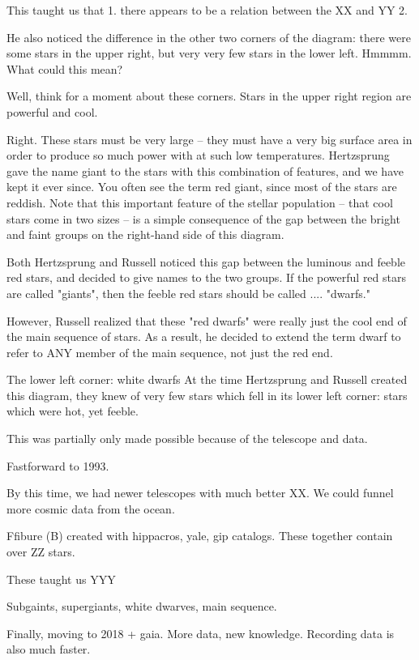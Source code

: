  This taught us that
 1. there appears to be a relation between the XX and YY
 2.


 He also noticed the difference in the other two corners of the diagram: there were some stars in the upper right, but very very few stars in the lower left. Hmmmm. What could this mean?

Well, think for a moment about these corners. Stars in the upper right region are powerful and cool.

Right. These stars must be very large -- they must have a very big surface area in order to produce so much power with at such low temperatures. Hertzsprung gave the name giant to the stars with this combination of features, and we have kept it ever since. You often see the term red giant, since most of the stars are reddish. Note that this important feature of the stellar population -- that cool stars come in two sizes -- is a simple consequence of the gap between the bright and faint groups on the right-hand side of this diagram.

Both Hertzsprung and Russell noticed this gap between the luminous and feeble red stars, and decided to give names to the two groups. If the powerful red stars are called "giants", then the feeble red stars should be called .... "dwarfs."


However, Russell realized that these "red dwarfs" were really just the cool end of the main sequence of stars. As a result, he decided to extend the term dwarf to refer to ANY member of the main sequence, not just the red end.


The lower left corner: white dwarfs
At the time Hertzsprung and Russell created this diagram, they knew of very few stars which fell in its lower left corner: stars which were hot, yet feeble.

This was partially only made possible because of the telescope and data.




Fastforward to 1993.

By this time, we had newer telescopes with much better XX.
We could funnel more cosmic data from the ocean.

Ffibure (B) created with hippacros, yale, gip catalogs. These together
contain over ZZ stars.

These taught us YYY


Subgaints, supergiants, white dwarves, main sequence.



Finally, moving to 2018 + gaia. More data, new knowledge.
Recording data is also much faster.




